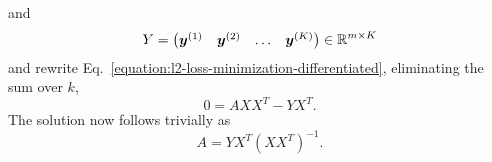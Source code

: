 %
and
%
\begin{equation}
    Y = \begin{pmatrix}
        \bm{y}^{(1)} & \bm{y}^{(2)} & \dots & \bm{y}^{(K)}
    \end{pmatrix} \in \mathbb{R}^{m \times K}
\end{equation}
%
and rewrite Eq.~\eqref{equation:l2-loss-minimization-differentiated}, eliminating the sum over $k$, 
%
\begin{equation}
    0 = A X X^T - Y X^T.
\end{equation}
%
The solution now follows trivially as
%
\begin{equation}
    A = Y X^T (X X^T)^{-1}.
\end{equation}
%
